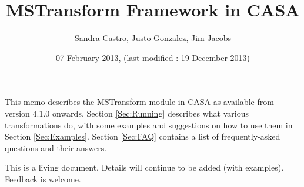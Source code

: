 \documentclass[11pt]{article}
\begin{document}
\title{MSTransform Framework in CASA}
\author{Sandra Castro, Justo Gonzalez, Jim Jacobs}
\date{07 February 2013, (last modified : 19 December 2013)}
\maketitle

This memo describes the MSTransform module in CASA as available from version
4.1.0 onwards.
Section \ref{Sec:Running} 
describes what 
various transformations do, with some examples and suggestions on how to use them in
Section \ref{Sec:Examples}. 
Section \ref{Sec:FAQ} contains a list of frequently-asked questions and their answers.

This is a living document. Details will continue to be added (with examples). Feedback is welcome.

\tableofcontents

%


\end{document}
